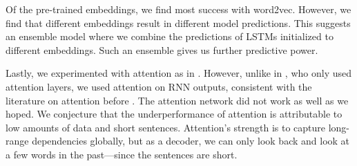 \documentclass[12pt]{article}
\begin{document}
Of the pre-trained embeddings, we find most success with word2vec. However, we
find that different embeddings result in different model predictions. This
suggests an ensemble model where we combine the predictions of LSTMs initialized
to different embeddings. Such an ensemble gives us further predictive power.

Lastly, we experimented with attention as in \cite{vaswani2017attention}.
However, unlike in \cite{vaswani2017attention}, who only used attention layers,
we used attention on RNN outputs, consistent with the literature on attention
before \cite{vaswani2017attention}. The attention network did not work as well
as we hoped. We conjecture that the underperformance of attention is
attributable to low amounts of data and short sentences. Attention's strength is
to capture long-range dependencies globally, but as a decoder, we can only look
back and look at a few words in the past---since the sentences are short.
\end{document}
